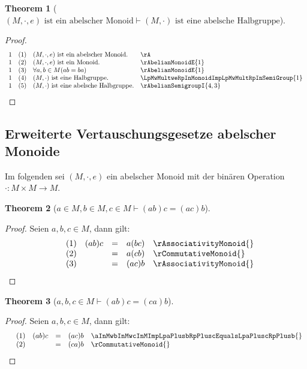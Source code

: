 \documentclass{book}
\theoremstyle{plain}
\newtheorem{theorem}{Theorem}
\theoremstyle{remark}
\theoremstyle{definition}
\begin{document}
\label{LpMwMultweRpInAbelMonoidImpLpMwMultRpInAbelSemiGroup}
\begin{theorem}[\((M,\cdot, e) \text{ ist ein abelscher Monoid} \vdash (M,\cdot) \text{ ist eine abelsche Halbgruppe}\)]
\end{theorem}
\begin{proof}
	\[
	\begin{array}{llll}
		1 &  (1) & (M, \cdot, e) \text{ ist ein abelscher Monoid.} & \rA \\
		1 &  (2) & (M, \cdot, e) \text{ ist ein Monoid.} & \rAbelianMonoidE{1} \\	
		1 &  (3) & \forall a, b \in M (ab = ba) & \rAbelianMonoidE{1} \\
		1 &  (4) & (M, \cdot) \text{ ist eine Halbgruppe.} & \LpMwMultweRpInMonoidImpLpMwMultRpInSemiGroup{1} \\	
  		1 &  (5) & (M, \cdot) \text{ ist eine abelsche Halbgruppe.} & \rAbelianSemigroupI{4,3} \\	
	\end{array}
	\]
\end{proof}

\subsection{Erweiterte Vertauschungsgesetze abelscher Monoide}
Im folgenden sei \((M, \cdot, e)\) ein abelscher Monoid mit der binären Operation \(\cdot :M\times M\rightarrow M\).

\label{aInMwbInMwcInMImpLpaPlusbRpPluscEqualsLpaPluscRpPlusb}
\begin{theorem}[\(a\in M, b\in M, c\in M \vdash (ab)c=(ac)b\)]
\end{theorem}
\begin{proof}
        Seien \(a,b,c\in M\), dann gilt:
        \[
	\begin{array}{lllcll}
		  &  (1) & (ab)c &=& a(bc) & \rAssociativityMonoid{} \\
            &  (2) &             &=& a(cb) & \rCommutativeMonoid{} \\
    	&  (3) & &=&(ac)b & \rAssociativityMonoid{} \\
	\end{array}
	\]
\end{proof}

\label{MInAbelMonoidwawbwcInMImpLpabRpcEqualsLpcaRpb}
\begin{theorem}[\(a,b,c\in M \vdash (ab)c=(ca)b\)]
\end{theorem}
\begin{proof}
        Seien \(a,b,c\in M\), dann gilt:
        \[
	\begin{array}{lllcll}
		  &  (1) & (ab)c &=& (ac)b & \aInMwbInMwcInMImpLpaPlusbRpPluscEqualsLpaPluscRpPlusb{} \\
            &  (2) &             &=& (ca)b & \rCommutativeMonoid{} \\
	\end{array}
	\]
\end{proof}
\end{document}
